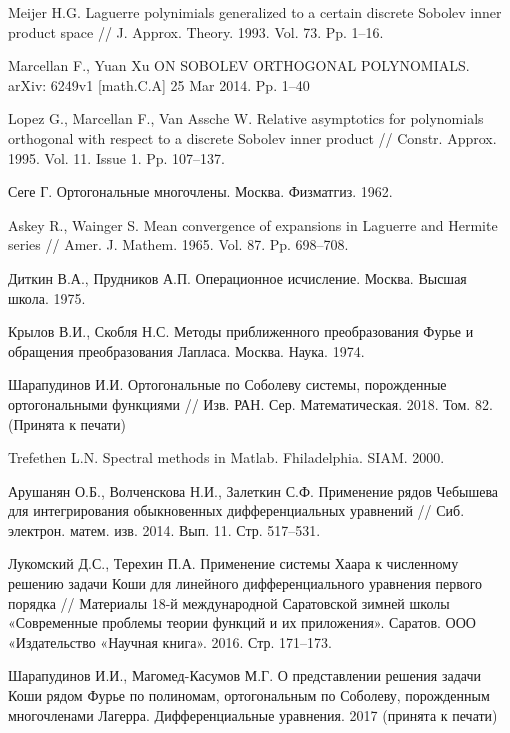 \begin{thebibliography}{20}
{Meijer H.G.}
Laguerre polynimials generalized to a certain discrete Sobolev inner product space // J. Approx. Theory. 1993. Vol. 73. Pp. 1--16.


{Marcellan F., Yuan Xu}
ON SOBOLEV ORTHOGONAL POLYNOMIALS. arXiv: 6249v1 [math.C.A] 25 Mar 2014. Pp. 1--40


{Lopez G., Marcellan F., Van Assche W.}
Relative asymptotics for polynomials orthogonal with respect to a discrete Sobolev inner product // Constr. Approx. 1995. Vol. 11. Issue 1. Pp. 107--137.


{Сеге Г.}
Ортогональные многочлены. Москва. Физматгиз. 1962.


{Askey R., Wainger S.}
Mean convergence of expansions in Laguerre and Hermite series // Amer. J. Mathem. 1965. Vol. 87. Pp. 698--708.


{Диткин В.А., Прудников А.П.}
Операционное исчисление. Москва. Высшая школа. 1975.


{Крылов В.И., Скобля Н.С.}
Методы приближенного преобразования Фурье и обращения преобразования Лапласа. Москва. Наука. 1974.


Шарапудинов И.И. Ортогональные  по Соболеву системы, порожденные ортогональными функциями // Изв. РАН. Сер. Математическая. 2018. Том. 82. (Принята к печати)


{Trefethen  L.N.}
Spectral methods in Matlab. Fhiladelphia. SIAM. 2000.


{Арушанян О.Б., Волченскова Н.И., Залеткин С.Ф.}
Применение рядов Чебышева для интегрирования обыкновенных дифференциальных уравнений // Сиб. электрон. матем. изв. 2014. Вып. 11. Стр. 517--531.


{Лукомский Д.С., Терехин П.А.}
Применение системы Хаара к численному решению задачи Коши для линейного дифференциального уравнения первого порядка // Материалы 18-й международной Саратовской зимней школы «Современные проблемы теории функций и их приложения». Саратов. ООО «Издательство «Научная книга». 2016. Стр. 171--173.


{Шарапудинов И.И., Магомед-Касумов М.Г.}
О представлении решения задачи Коши  рядом Фурье  по полиномам, ортогональным по  Соболеву, порожденным многочленами Лагерра. Дифференциальные уравнения. 2017 (принята к печати)



\end{thebibliography}
